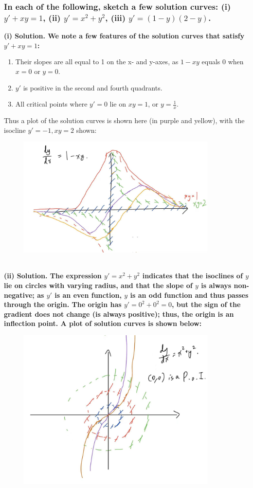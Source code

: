 \documentclass{article}
\begin{document}
\subsubsection*{In each of the following, sketch a few solution curves: (i) $y'+xy=1$, (ii) $y' = x^2+y^2$, (iii) $y'=(1-y)(2-y)$.}
\bf (i) Solution. \normalfont We note a few features of the solution curves that satisfy $y' + xy = 1$:
\begin{enumerate}
    \item Their slopes are all equal to 1 on the x- and y-axes, as $1-xy$ equals 0 when $x = 0$ or $y=0$.
    \item $y'$ is positive in the second and fourth quadrants.
    \item All critical points where $y' = 0$ lie on $xy = 1$, or $y=\frac{1}{x}$.
\end{enumerate}
Thus a plot of the solution curves is shown here (in purple and yellow), with the isocline $y' = -1, xy = 2$ shown:
\begin{figure}[h]
    \centering
    \includegraphics[width=10cm]{DE-ch2-8-1.jpg}
\end{figure}\\
\bf (ii) Solution. \normalfont The expression $y' = x^2 + y^2$ indicates that the isoclines of $y$ lie on circles with varying radius, and that the slope of $y$ is always non-negative; as $y'$ is an even function, $y$ is an odd function and thus passes through the origin. The origin has $y' = 0^2 + 0^2 = 0$, but the sign of the gradient does not change (is always positive); thus, the origin is an inflection point. A plot of solution curves is shown below:
\begin{figure}[h]
    \centering
    \includegraphics[width=10cm]{DE-ch2-8-2.jpg}
\end{figure}\\
\end{document}
